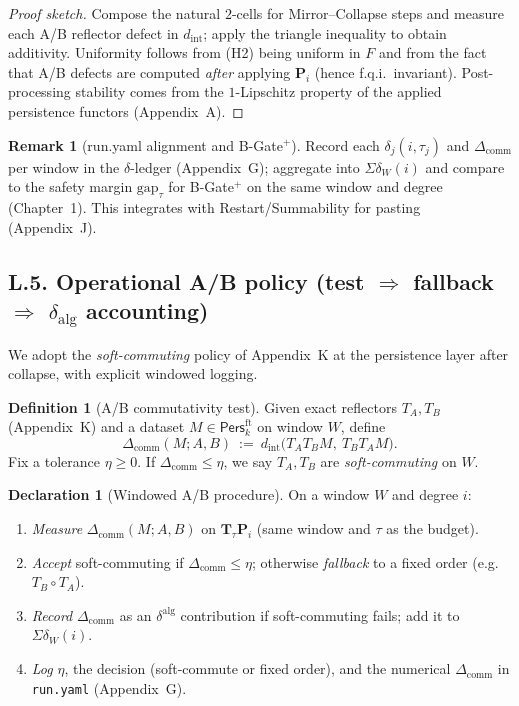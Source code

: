\documentclass[11pt]{article}
\numberwithin{equation}{section}
\theoremstyle{plain}
\theoremstyle{definition}
\theoremstyle{remark}
\DeclareRobustCommand{\hyp}{\nobreakdash-}
\newcommand{\Pers}{\mathsf{Pers}}
\theoremstyle{plain}
\theoremstyle{definition}
\numberwithin{equation}{section}
\theoremstyle{definition}
\newtheorem{definition}[theorem]{Definition}
\newtheorem{remark}[theorem]{Remark}
\newtheorem{declaration}[theorem]{Declaration}
\numberwithin{equation}{section}
\theoremstyle{plain}
\theoremstyle{definition}
\theoremstyle{remark}
\begin{document}
\begin{proof}[Proof sketch]
Compose the natural \(2\)\hyp cells for Mirror–Collapse steps and measure each A/B reflector defect in \(d_{\mathrm{int}}\); apply the triangle inequality to obtain additivity. Uniformity follows from (H2) being uniform in \(F\) and from the fact that A/B defects are computed \emph{after} applying \(\mathbf{P}_i\) (hence f.q.i.\ invariant). Post\hyp processing stability comes from the \(1\)\hyp Lipschitz property of the applied persistence functors (Appendix~A).
\end{proof}

\begin{remark}[run.yaml alignment and B-Gate\(^{+}\)]
Record each \(\delta_j(i,\tau_j)\) and \(\Delta_{\mathrm{comm}}\) per window in the \(\delta\)\hyp ledger (Appendix~G); aggregate into \(\Sigma\delta_W(i)\) and compare to the safety margin \(\mathrm{gap}_\tau\) for B-Gate\(^{+}\) on the same window and degree (Chapter~1). This integrates with Restart/Summability for pasting (Appendix~J).
\end{remark}

\subsection*{L.5. Operational A/B policy (test \(\Rightarrow\) fallback \(\Rightarrow\) \(\delta_{\mathrm{alg}}\) accounting)}
We adopt the \emph{soft\hyp commuting} policy of Appendix~K at the persistence layer after collapse, with explicit windowed logging.

\begin{definition}[A/B commutativity test]\label{L:def:ab}
Given exact reflectors \(T_A,T_B\) (Appendix~K) and a dataset \(M\in\Pers^{\mathrm{ft}}_k\) on window \(W\), define
\[
\Delta_{\mathrm{comm}}(M;A,B)\ :=\ d_{\mathrm{int}}\big(T_AT_BM,\ T_BT_AM\big).
\]
Fix a tolerance \(\eta\ge 0\). If \(\Delta_{\mathrm{comm}}\le \eta\), we say \(T_A,T_B\) are \emph{soft\hyp commuting} on \(W\).
\end{definition}

\begin{declaration}[Windowed A/B procedure]\label{L:dec:ab}
On a window \(W\) and degree \(i\):
\begin{enumerate}\itemsep0.2em
  \item \emph{Measure} \(\Delta_{\mathrm{comm}}(M;A,B)\) on \(\mathbf{T}_\tau\mathbf{P}_i\) (same window and \(\tau\) as the budget).
  \item \emph{Accept} soft\hyp commuting if \(\Delta_{\mathrm{comm}}\le\eta\); otherwise \emph{fallback} to a fixed order (e.g.\ \(T_B\circ T_A\)).
  \item \emph{Record} \(\Delta_{\mathrm{comm}}\) as an \(\delta^{\mathrm{alg}}\) contribution if soft\hyp commuting fails; add it to \(\Sigma\delta_W(i)\).
  \item \emph{Log} \(\eta\), the decision (soft\hyp commute or fixed order), and the numerical \(\Delta_{\mathrm{comm}}\) in \texttt{run.yaml} (Appendix~G).
\end{enumerate}
\end{declaration}
\end{document}
